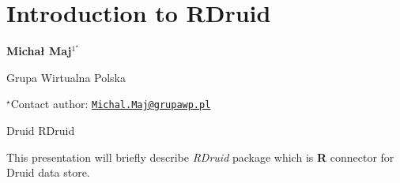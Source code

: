 \documentclass[\main/boa.tex]{subfiles}
\begin{document}
\section{Introduction to RDruid}

\begin{center}
  {\bf {} Michał Maj$^{1^\star}$}
\end{center}

\vskip 0.3cm

\begin{affiliations}
\begin{enumerate}
\begin{minipage}{0.915\textwidth}
\centering
\item Grupa Wirtualna Polska \\[-2pt]
\end{minipage}
\end{enumerate}
$^\star$Contact author: \href{mailto:Michal.Maj@grupawp.pl}{\nolinkurl{Michal.Maj@grupawp.pl}}\\
\end{affiliations}

\vskip 0.5cm

\begin{minipage}{0.915\textwidth}
\keywords Druid
\packages {} RDruid
\end{minipage}

\vskip 0.8cm

This presentation will briefly describe \emph{RDruid} package which is
\textbf{R} connector for Druid data store.
\end{document}
